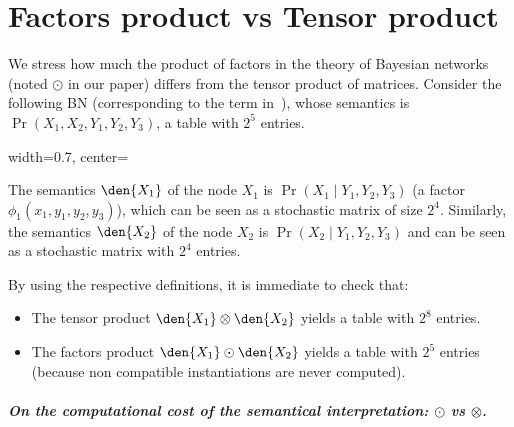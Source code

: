 \section{Factors product vs Tensor product}
\label{app:cost}\label{app:section2}


We stress how much the product of factors in the theory of Bayesian networks (noted $\odot$ in our paper) differs from the tensor product of matrices. 
Consider the following BN (corresponding to the term in~\cite[Example 9.7]{popl24}), whose semantics is $\Pr(X_1, X_2,Y_1,Y_2,Y_3)$, a table with $2^5$ entries.

\begin{adjustbox}{width=0.7\linewidth, center=\linewidth}
\end{adjustbox}
The semantics $\den{X_1}$ of the node $X_1$ is $\Pr(X_1 \mid Y_1,Y_2,Y_3)$ (a factor $\phi_1(x_1,y_1,y_2,y_3)$), which can be seen as a stochastic matrix of size $2^4$.
Similarly, the semantics $\den{X_2}$ of the node $X_2$ is $\Pr(X_2 \mid Y_1,Y_2,Y_3)$ and can be seen as a stochastic matrix with $2^4$ entries.

By using the respective definitions, it is immediate to check that:
\begin{itemize}
\item
The tensor product $\den {X_1} \otimes \den {X_2} $ yields a table with $2^8$ entries.
\item
The factors product $\den {X_1} \odot \den {X_2} $ yields a table with $2^5$ entries (because non compatible instantiations are never computed).
\end{itemize}

\subparagraph{On the computational cost of the semantical interpretation: $\odot$ vs $\otimes$.}

